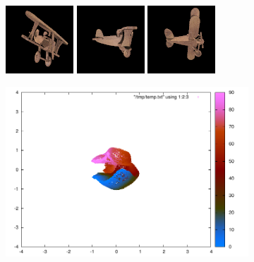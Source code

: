 \documentclass{article} %
\begin{document}
\begin{figure}
\centering
\begin{subfigure}[b]{0.49 \textwidth}
\centering
\includegraphics[scale=0.5]{./Figures/toyplane.png} 
\includegraphics[scale=0.5]{./Figures/toyplane2.png} 
\includegraphics[scale=0.5]{./Figures/toyplane3.png}
        \caption{}
\label{fig:toyplane}
\end{subfigure}
%
\begin{subfigure}[b]{0.49 \textwidth}
\centering
\includegraphics[scale=0.5,trim = 120 100 130 70, clip]{./Figures/drlim1.pdf}

\end{subfigure}
\end{figure}
\end{document}
